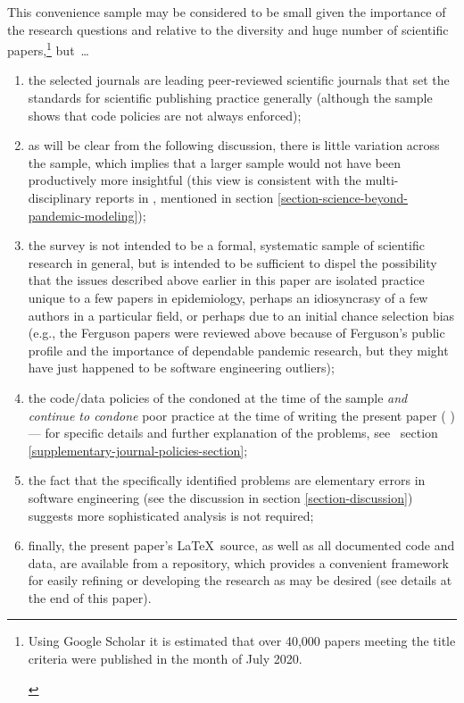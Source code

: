 \documentclass[10pt,a4paper]{article}
\begin{document}
\begin{change}
This convenience sample may be considered to be small given the importance of the research questions and relative to the diversity and huge number of scientific papers,\footnote{\begin{change}Using Google Scholar it is estimated that over 40,000 papers meeting the title criteria were published in the month of July 2020.\end{change}} but~\ldots

\begin{enumerate}
\item the selected journals are leading peer-reviewed scientific journals that set the standards for scientific publishing practice generally (although the sample shows that code policies are not always enforced); 

\item as will be clear from the following discussion, there is little variation across the sample, which implies that a larger sample would not have been productively more insightful (this view is consistent with the multi-disciplinary reports in \cite{nature-review}, mentioned in section \ref{section-science-beyond-pandemic-modeling}); 

\item the survey is not intended to be a formal, systematic sample of scientific research in general, but is intended to be sufficient to dispel the possibility that the issues described above earlier in this paper are isolated practice unique to a few papers in epidemiology, perhaps an idiosyncrasy of a few authors in a particular field, or perhaps due to an initial chance selection bias (e.g., the Ferguson papers were reviewed above because of Ferguson's public profile and the importance of dependable pandemic research, but they might have just happened to be software engineering outliers);

\item the code/data policies of the  condoned at the time of the sample \emph{and continue to condone\/} poor practice at the time of writing the present paper (\monthname{\month} \the\year) --- for specific details and further explanation of the problems, see \supplement\ section \ref{supplementary-journal-policies-section};

\item
the fact that the specifically identified problems are elementary errors in software engineering (see the discussion in section \ref{section-discussion}) suggests more sophisticated analysis is not required;

\item 
finally, the present paper's \LaTeX\ source, as well as all documented code and data, are available from a repository, which provides a convenient framework for easily refining or developing the research as may be desired (see details at the end of this paper).
\end{enumerate}
\end{change}
\end{document}

